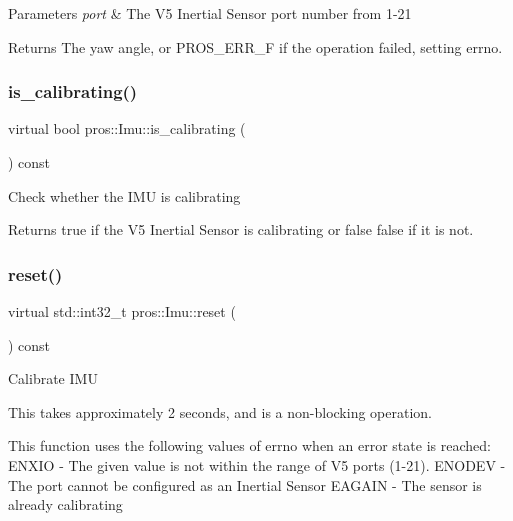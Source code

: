 \begin{DoxyParams}{Parameters}
{\em port} & The V5 Inertial Sensor port number from 1-\/21 \\
\hline
\end{DoxyParams}
\begin{DoxyReturn}{Returns}
The yaw angle, or P\+R\+O\+S\+\_\+\+E\+R\+R\+\_\+F if the operation failed, setting errno. 
\end{DoxyReturn}
\mbox{\label{classpros_1_1Imu_af7426c086f6f810cca98f4e77765189c}} 
\subsubsection{\texorpdfstring{is\+\_\+calibrating()}{is\_calibrating()}}
{\footnotesize\ttfamily virtual bool pros\+::\+Imu\+::is\+\_\+calibrating (\begin{DoxyParamCaption}{ }\end{DoxyParamCaption}) const\hspace{0.3cm}{\ttfamily [virtual]}}

Check whether the I\+MU is calibrating

\begin{DoxyReturn}{Returns}
true if the V5 Inertial Sensor is calibrating or false false if it is not. 
\end{DoxyReturn}
\mbox{\label{classpros_1_1Imu_ad7973cfad5f8f83e7007342055197c43}} 
\subsubsection{\texorpdfstring{reset()}{reset()}}
{\footnotesize\ttfamily virtual std\+::int32\+\_\+t pros\+::\+Imu\+::reset (\begin{DoxyParamCaption}{ }\end{DoxyParamCaption}) const\hspace{0.3cm}{\ttfamily [virtual]}}

Calibrate I\+MU

This takes approximately 2 seconds, and is a non-\/blocking operation.

This function uses the following values of errno when an error state is reached\+: E\+N\+X\+IO -\/ The given value is not within the range of V5 ports (1-\/21). E\+N\+O\+D\+EV -\/ The port cannot be configured as an Inertial Sensor E\+A\+G\+A\+IN -\/ The sensor is already calibrating


